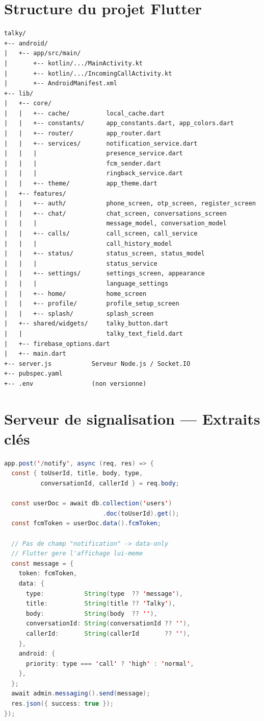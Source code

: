 \documentclass[12pt,a4paper]{report}
\begin{document}
\chapter{Structure du projet Flutter}
\begin{lstlisting}[caption={Arborescence complète du projet Talky}]
talky/
+-- android/
|   +-- app/src/main/
|       +-- kotlin/.../MainActivity.kt
|       +-- kotlin/.../IncomingCallActivity.kt
|       +-- AndroidManifest.xml
+-- lib/
|   +-- core/
|   |   +-- cache/          local_cache.dart
|   |   +-- constants/      app_constants.dart, app_colors.dart
|   |   +-- router/         app_router.dart
|   |   +-- services/       notification_service.dart
|   |   |                   presence_service.dart
|   |   |                   fcm_sender.dart
|   |   |                   ringback_service.dart
|   |   +-- theme/          app_theme.dart
|   +-- features/
|   |   +-- auth/           phone_screen, otp_screen, register_screen
|   |   +-- chat/           chat_screen, conversations_screen
|   |   |                   message_model, conversation_model
|   |   +-- calls/          call_screen, call_service
|   |   |                   call_history_model
|   |   +-- status/         status_screen, status_model
|   |   |                   status_service
|   |   +-- settings/       settings_screen, appearance
|   |   |                   language_settings
|   |   +-- home/           home_screen
|   |   +-- profile/        profile_setup_screen
|   |   +-- splash/         splash_screen
|   +-- shared/widgets/     talky_button.dart
|   |                       talky_text_field.dart
|   +-- firebase_options.dart
|   +-- main.dart
+-- server.js           Serveur Node.js / Socket.IO
+-- pubspec.yaml
+-- .env                (non versionne)
\end{lstlisting}

\chapter{Serveur de signalisation --- Extraits clés}
\begin{lstlisting}[language=Java,caption={Endpoint FCM data-only}]
app.post('/notify', async (req, res) => {
  const { toUserId, title, body, type,
          conversationId, callerId } = req.body;

  const userDoc = await db.collection('users')
                           .doc(toUserId).get();
  const fcmToken = userDoc.data().fcmToken;

  // Pas de champ "notification" -> data-only
  // Flutter gere l'affichage lui-meme
  const message = {
    token: fcmToken,
    data: {
      type:           String(type  ?? 'message'),
      title:          String(title ?? 'Talky'),
      body:           String(body  ?? ''),
      conversationId: String(conversationId ?? ''),
      callerId:       String(callerId       ?? ''),
    },
    android: {
      priority: type === 'call' ? 'high' : 'normal',
    },
  };
  await admin.messaging().send(message);
  res.json({ success: true });
});
\end{lstlisting}
\end{document}
